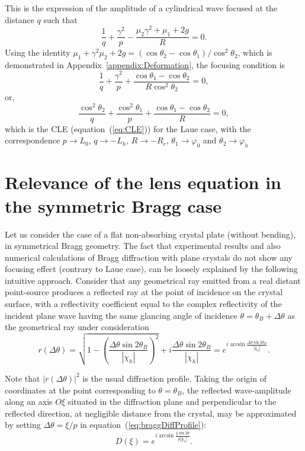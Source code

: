 \documentclass[preprint]{iucr}              %
\begin{document}
This is the expression of the amplitude of a cylindrical wave focused at the distance $q$ such that
\begin{equation}
    \frac{1}{q}+\frac{\gamma^2}{p}-\frac{\mu_2\gamma^2+\mu_1+2g}{R}=0. 
\end{equation}
Using the identity $\mu_1+\gamma^2\mu_2+2g=(\cos\theta_2-\cos\theta_1)/\cos^2\theta_2$, which is demonstrated in Appendix~\ref{appendix:Deformation}, the focusing condition is 
\begin{equation}
    \frac{1}{q}+\frac{\gamma^2}{p}+\frac{\cos\theta_1-\cos\theta_2}{R\cos^2\theta_2}=0,
\end{equation}
or,
\begin{equation}
    \frac{\cos^2\theta_2}{q}+\frac{\cos^2\theta_1}{p}+\frac{\cos\theta_1-\cos\theta_2}{R}=0,
\end{equation}
which is the CLE (equation~(\ref{eq:CLE})) for the Laue case, with the correspondence $p \rightarrow L_0$, $q \rightarrow -L_h$, $R \rightarrow -R_c$, $\theta_1 \rightarrow \varphi_0$ and $\theta_2 \rightarrow \varphi_h$


\section{Relevance of the lens equation in the symmetric Bragg case}
\label{sec:BraggGeometry}

Let us consider the case of a flat non-absorbing crystal plate (without bending), in symmetrical Bragg geometry. The fact that experimental results and also numerical calculations \cite{Honkanen2018} of Bragg diffraction with plane crystals do not show any focusing effect (contrary to Laue case), can be loosely explained by the following intuitive approach. Consider that any geometrical ray emitted from a real distant point-source produces a reflected ray at the point of incidence on the crystal surface, with a reflectivity coefficient equal to the complex reflectivity of the incident plane wave having the same glancing angle of incidence $\theta=\theta_B+\Delta\theta$ as the geometrical ray under consideration
\begin{equation}
\label{eq:braggDiffProfile}
    r(\Delta\theta) = \sqrt{1-\left(\frac{\Delta\theta\sin2\theta_B}{|\chi_h|}\right)^2} + i \frac{\Delta\theta\sin2\theta_B}{|\chi_h|} =
    e^{i \arcsin{\frac{\Delta\theta \sin2\theta_B}{ |\chi_h|}}}.
\end{equation}

Note that $|r(\Delta\theta)|^2$ is the usual diffraction profile. Taking the origin of coordinates at the point corresponding to $\theta=\theta_B$, the reflected wave-amplitude along an axis $O\xi$ situated in the diffraction plane and perpendicular to the reflected direction, at negligible distance from the crystal, may be approximated by setting  $\Delta\theta=\xi/p$ in equation~(\ref{eq:braggDiffProfile}):
\begin{equation}
    D(\xi) = e^{i \arcsin{\frac{\xi \sin2\theta}{p |\chi_h|}}}.
\end{equation}
\end{document}
